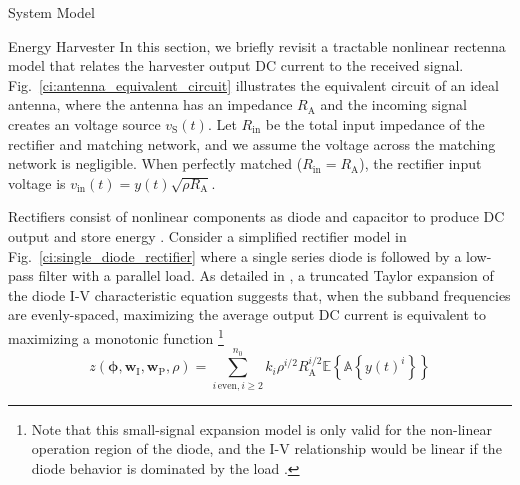 \documentclass[journal]{IEEEtran}
\begin{document}
\begin{section}{System Model}
\begin{subsection}{Energy Harvester}
			In this section, we briefly revisit a tractable nonlinear rectenna model that relates the harvester output DC current to the received signal. Fig.~\ref{ci:antenna_equivalent_circuit} illustrates the equivalent circuit of an ideal antenna, where the antenna has an impedance $R_{\mathrm{A}}$ and the incoming signal creates an voltage source $v_{\mathrm{S}}(t)$. Let $R_{\mathrm{in}}$ be the total input impedance of the rectifier and matching network, and we assume the voltage across the matching network is negligible. When perfectly matched ($R_{\mathrm{in}}=R_{\mathrm{A}}$), the rectifier input voltage is $v_{\mathrm{in}}(t)=y(t)\sqrt{\rho R_{\mathrm{A}}}$.

			Rectifiers consist of nonlinear components as diode and capacitor to produce DC output and store energy \cite{Pinuela2013}. Consider a simplified rectifier model in Fig.~\ref{ci:single_diode_rectifier} where a single series diode is followed by a low-pass filter with a parallel load. As detailed in \cite{Clerckx2016a,Clerckx2018b}, a truncated Taylor expansion of the diode I-V characteristic equation suggests that, when the subband frequencies are evenly-spaced, maximizing the average output DC current is equivalent to maximizing a monotonic function \footnote{Note that this small-signal expansion model is only valid for the non-linear operation region of the diode, and the I-V relationship would be linear if the diode behavior is dominated by the load \cite{Clerckx2016a}.}
			\begin{equation}\label{eq:z}
				z(\boldsymbol{\phi},\boldsymbol{w}_{\mathrm{I}},\boldsymbol{w}_{\mathrm{P}},\rho)=\sum_{i\,\mathrm{even},i\ge2}^{n_0}{k_i}{\rho^{i/2}}{R_{\mathrm{A}}^{i/2}}{\mathbb{E}\left\{\mathbb{A}\left\{y(t)^i\right\}\right\}}
			\end{equation}

\end{subsection}
\end{section}
\end{document}
